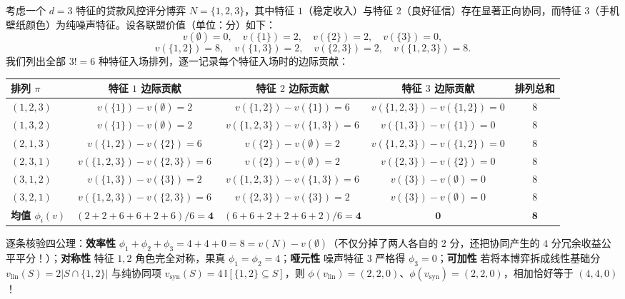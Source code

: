 \begin{example}\label{ex:shapley-3feat}
考虑一个 $d = 3$ 特征的贷款风控评分博弈 $N = \{1, 2, 3\}$，其中特征 $1$（稳定收入）与特征 $2$（良好征信）存在显著正向协同，而特征 $3$（手机壁纸颜色）为纯噪声特征。设各联盟价值（单位：分）如下：
\[
  v(\emptyset) = 0, \quad
  v(\{1\}) = 2, \quad v(\{2\}) = 2, \quad v(\{3\}) = 0,
\]
\[
  v(\{1,2\}) = 8, \quad v(\{1,3\}) = 2, \quad v(\{2,3\}) = 2, \quad v(\{1,2,3\}) = 8.
\]
我们列出全部 $3! = 6$ 种特征入场排列，逐一记录每个特征入场时的边际贡献：

\begin{center}
\small
\begin{tabular}{@{}lcccc@{}}
  \toprule
  排列 $\pi$ & 特征 $1$ 边际贡献 & 特征 $2$ 边际贡献 & 特征 $3$ 边际贡献 & 排列总和 \\
  \midrule
  $(1, 2, 3)$ & $v(\{1\})-v(\emptyset)=2$ & $v(\{1,2\})-v(\{1\})=6$ & $v(\{1,2,3\})-v(\{1,2\})=0$ & $8$ \\
  $(1, 3, 2)$ & $v(\{1\})-v(\emptyset)=2$ & $v(\{1,2,3\})-v(\{1,3\})=6$ & $v(\{1,3\})-v(\{1\})=0$ & $8$ \\
  $(2, 1, 3)$ & $v(\{1,2\})-v(\{2\})=6$ & $v(\{2\})-v(\emptyset)=2$ & $v(\{1,2,3\})-v(\{1,2\})=0$ & $8$ \\
  $(2, 3, 1)$ & $v(\{1,2,3\})-v(\{2,3\})=6$ & $v(\{2\})-v(\emptyset)=2$ & $v(\{2,3\})-v(\{2\})=0$ & $8$ \\
  $(3, 1, 2)$ & $v(\{1,3\})-v(\{3\})=2$ & $v(\{1,2,3\})-v(\{1,3\})=6$ & $v(\{3\})-v(\emptyset)=0$ & $8$ \\
  $(3, 2, 1)$ & $v(\{1,2,3\})-v(\{2,3\})=6$ & $v(\{2,3\})-v(\{3\})=2$ & $v(\{3\})-v(\emptyset)=0$ & $8$ \\
  \midrule
  \textbf{均值 $\phi_i(v)$} & $(2+2+6+6+2+6)/6 = \mathbf{4}$ & $(6+6+2+2+6+2)/6 = \mathbf{4}$ & $\mathbf{0}$ & $\mathbf{8}$ \\
  \bottomrule
\end{tabular}
\end{center}

逐条核验四公理：\textbf{效率性} $\phi_1 + \phi_2 + \phi_3 = 4 + 4 + 0 = 8 = v(N) - v(\emptyset)$（不仅分掉了两人各自的 $2$ 分，还把协同产生的 $4$ 分冗余收益公平平分！）；\textbf{对称性} 特征 $1, 2$ 角色完全对称，果真 $\phi_1 = \phi_2 = 4$；\textbf{哑元性} 噪声特征 $3$ 严格得 $\phi_3 = 0$；\textbf{可加性} 若将本博弈拆成线性基础分 $v_{\text{lin}}(S) = 2|S \cap \{1,2\}|$ 与纯协同项 $v_{\text{syn}}(S) = 4\,\mathbb{I}[\{1,2\}\subseteq S]$，则 $\phi(v_{\text{lin}})=(2,2,0)$、$\phi(v_{\text{syn}})=(2,2,0)$，相加恰好等于 $(4,4,0)$！
\end{example}


